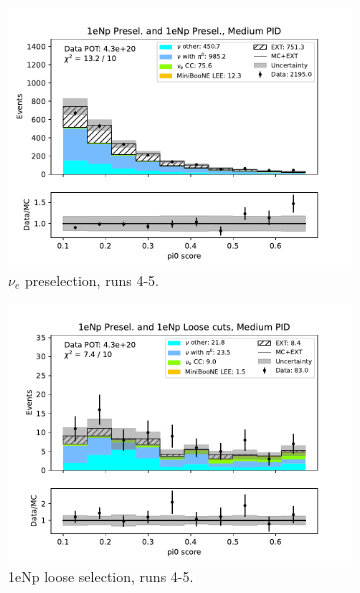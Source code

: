 \begin{figure}[H]
\begin{subfigure}{0.5\linewidth}
        \includegraphics[width=\linewidth]{technote/Sidebands/Figures/NearSideband/near_sideband_pi0_score_run4b4c4d5_NP_NP_MEDIUM_PID.pdf}
        \caption{$\nu_e$ preselection, runs 4-5.}
    \end{subfigure}%
    \begin{subfigure}{0.5\linewidth}
        \includegraphics[width=\linewidth]{technote/Sidebands/Figures/NearSideband/near_sideband_pi0_score_run4b4c4d5_NP_NPL_MEDIUM_PID.pdf}
        \caption{1eNp loose selection, runs 4-5.}
    \end{subfigure}    
    \begin{subfigure}{0.5\linewidth}

\end{subfigure}
\end{figure}
